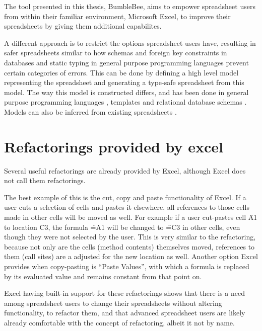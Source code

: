 The tool presented in this thesis, BumbleBee, aims to empower spreadsheet users from within their familiar environment, Microsoft Excel, to improve their spreadsheets by giving them additional capabilites.

A different approach is to restrict the options spreadsheet users have, resulting in safer spreadsheets similar to how schemas and foreign key constraints in databases and static typing in general purpose programming languages prevent certain categories of errors.
This can be done by defining a high level model representing the spreadsheet and generating a type-safe spreadsheet from this model.
The way this model is constructed differs, and has been done in general purpose programming languages \cite{paine2001ensuring, paine2006rapid}, templates \cite{engels2005classsheets, erwig2006gencel, bals2007classsheets, cunha2011type, cunha2011embedding, cunha2014model} and relational database schemas \cite{cunha2009spreadsheets}.
Models can also be inferred from existing spreadsheets \cite{abraham2006inferring,cunha2010automatically}.

\section{Refactorings provided by excel}

Several useful refactorings are already provided by Excel, although Excel does not call them refactorings.

The best example of this is the cut, copy and paste functionality of Excel.
If a user cuts a selection of cells and pastes it elsewhere, all references to those cells made in other cells will be moved as well.
For example if a user cut-pastes cell \f{A1} to location \f{C3}, the formula \f{=A1} will be changed to \f{=C3} in other cells, even though they were not selected by the user.
This is very similar to the  \cite{fowler1999refactoring} refactoring, because not only are the cells (method contents) themselves moved, references to them (call sites) are a adjusted for the new location as well.
Another option Excel provides when copy-pasting is ``Paste Values'', with which a formula is replaced by its evaluated value and remains constant from that point on.

Excel having built-in support for these refactorings shows that there is a need among spreadsheet users to change their spreadsheets without altering functionality, to refactor them, and that advanced spreadsheet users are likely already comfortable with the concept of refactoring, albeit it not by name.

